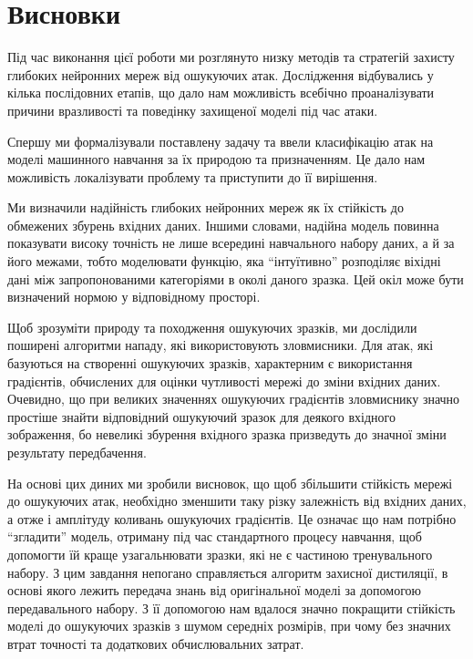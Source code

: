 \documentclass[14pt,a4paper]{extarticle}
\newcounter{e}
\numberwithin{equation}{section}
\numberwithin{figure}{section}
\begin{document}

 
 
 \newpage
 \thispagestyle{empty}
 \section*{Висновки}
 
 Під час виконання цієї роботи ми розглянуто низку методів та стратегій захисту глибоких нейронних мереж від ошукуючих атак. Дослідження відбувались у кілька послідовних етапів, що дало нам можливість всебічно проаналізувати причини вразливості та поведінку захищеної моделі під час атаки. 
 
 Спершу ми формалізували поставлену задачу та ввели класифікацію атак на моделі машинного навчання за їх природою та призначенням. Це дало нам можливість локалізувати проблему та приступити до її вирішення. 
 
 Ми визначили надійність глибоких нейронних мереж як їх стійкість до обмежених збурень вхідних даних. Іншими словами, надійна модель повинна показувати високу точність не лише всередині навчального набору даних, а й за його межами, тобто моделювати функцію, яка ``інтуїтивно'' розподіляє віхідні дані між запропонованими категоріями в околі даного зразка. Цей окіл може бути визначений нормою у відповідному просторі.
 
 Щоб зрозуміти природу та походження ошукуючих зразків, ми дослідили поширені алгоритми нападу, які використовують зловмисники.
 Для атак, які базуються на створенні ошукуючих зразків, характерним є використання градієнтів, обчислених для оцінки чутливості мережі до зміни вхідних даних. Очевидно, що при великих значеннях ошукуючих градієнтів зловмиснику значно простіше знайти відповідний ошукуючий зразок для деякого вхідного зображення, бо невеликі збурення вхідного зразка призведуть до значної зміни результату передбачення.
 
 На основі цих диних ми зробили висновок, що щоб збільшити стійкість мережі до ошукуючих атак, необхідно зменшити таку різку залежність від вхідних даних, а отже і амплітуду коливань ошукуючих градієнтів. Це означає що нам потрібно ``згладити'' модель, отриману під час стандартного процесу навчання, щоб допомогти їй краще узагальнювати зразки, які не є частиною тренувального набору. З цим завдання непогано справляється алгоритм захисної дистиляції, в основі якого лежить передача знань від оригінальної моделі за допомогою передавального набору. З її допомогою нам вдалося значно покращити стійкість моделі до ошукуючих зразків з шумом середніх розмірів, при чому без значних втрат точності та додаткових обчислювальних затрат.
 
\end{document}
